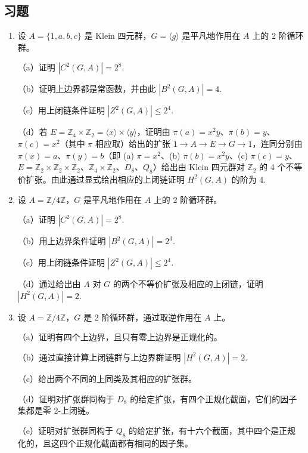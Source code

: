 \subsection*{习题}

\begin{enumerate}
\item 设 \(A = \{1, a, b, c\}\) 是 Klein 四元群，\(G = \langle g\rangle\) 是平凡地作用在 \(A\) 上的 2 阶循环群。

（a）证明 \(|C^2(G, A)| = 2^8\).

（b）证明上边界都是常函数，并由此 \(|B^2(G, A)| = 4\).

（c）用上闭链条件证明 \(|Z^2(G, A)| \leq 2^4\).

（d）若 \(E = \mathbb{Z}_4 \times \mathbb{Z}_2 = \langle x\rangle \times \langle y\rangle\)，证明由 \(\pi(a) = x^2y\)、\(\pi(b) = y\)、\(\pi(c) = x^2\)（其中 \(\pi\) 相应取）给出的扩张 \(1 \to A \to E \to G \to 1\)，连同分别由 \(\pi(x) = a\)、\(\pi(y) = b\)（即 (a) \(\pi = x^2\)、(b) \(\pi(b) = x^2y\)、(c) \(\pi(c) = y\)、\(E = \mathbb{Z}_2 \times \mathbb{Z}_2 \times \mathbb{Z}_2\)、\(\mathbb{Z}_4 \times \mathbb{Z}_2\)、\(D_8\)、\(Q_8\)）给出由 Klein 四元群对 \(\mathbb{Z}_2\) 的 4 个不等价扩张。由此通过显式给出相应的上闭链证明 \(H^2(G, A)\) 的阶为 4.

\item 设 \(A = \mathbb{Z}/4\mathbb{Z}\)，\(G\) 是平凡地作用在 \(A\) 上的 2 阶循环群。

（a）证明 \(|C^2(G, A)| = 2^8\).

（b）用上边界条件证明 \(|B^2(G, A)| = 2^3\).

（c）用上闭链条件证明 \(|Z^2(G, A)| \leq 2^4\).

（d）通过给出由 \(A\) 对 \(G\) 的两个不等价扩张及相应的上闭链，证明 \(|H^2(G, A)| = 2\).

\item 设 \(A = \mathbb{Z}/4\mathbb{Z}\)，\(G\) 是 2 阶循环群，通过取逆作用在 \(A\) 上。

（a）证明有四个上边界，且只有零上边界是正规化的。

（b）通过直接计算上闭链群与上边界群证明 \(|H^2(G, A)| = 2\).

（c）给出两个不同的上同类及其相应的扩张群。

（d）证明对扩张群同构于 \(D_8\) 的给定扩张，有四个正规化截面，它们的因子集都是零 2-上闭链。

（e）证明对扩张群同构于 \(Q_8\) 的给定扩张，有十六个截面，其中四个是正规化的，且这四个正规化截面都有相同的因子集。


\end{enumerate}
